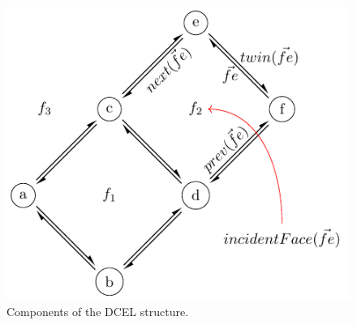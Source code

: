 

\begin{figure}
    \centering
    \includegraphics[width=0.9\linewidth]{figures/dcel_example/dcel_example}    
    \caption{Components of the DCEL structure.}\label{fig:pre_dcel}
\end{figure}




